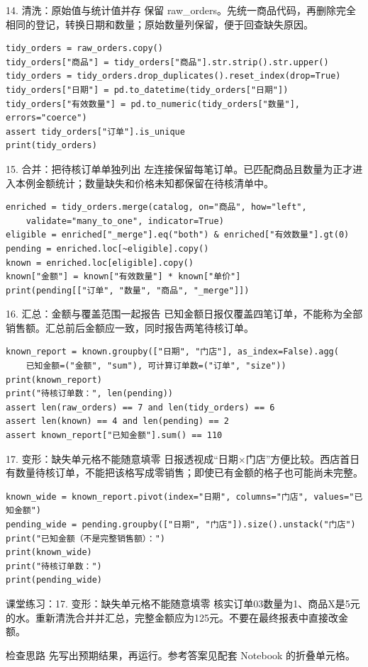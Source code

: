 \begin{frame}[fragile]{14. 清洗：原始值与统计值并存}
\small 保留 raw\_orders。先统一商品代码，再删除完全相同的登记，转换日期和数量；原始数量列保留，便于回查缺失原因。
\medskip
\begin{lstlisting}
tidy_orders = raw_orders.copy()
tidy_orders["商品"] = tidy_orders["商品"].str.strip().str.upper()
tidy_orders = tidy_orders.drop_duplicates().reset_index(drop=True)
tidy_orders["日期"] = pd.to_datetime(tidy_orders["日期"])
tidy_orders["有效数量"] = pd.to_numeric(tidy_orders["数量"], errors="coerce")
assert tidy_orders["订单"].is_unique
print(tidy_orders)
\end{lstlisting}
\end{frame}

\begin{frame}[fragile]{15. 合并：把待核订单单独列出}
\small 左连接保留每笔订单。已匹配商品且数量为正才进入本例金额统计；数量缺失和价格未知都保留在待核清单中。
\medskip
\begin{lstlisting}
enriched = tidy_orders.merge(catalog, on="商品", how="left",
    validate="many_to_one", indicator=True)
eligible = enriched["_merge"].eq("both") & enriched["有效数量"].gt(0)
pending = enriched.loc[~eligible].copy()
known = enriched.loc[eligible].copy()
known["金额"] = known["有效数量"] * known["单价"]
print(pending[["订单", "数量", "商品", "_merge"]])
\end{lstlisting}
\end{frame}

\begin{frame}[fragile]{16. 汇总：金额与覆盖范围一起报告}
\small 已知金额日报仅覆盖四笔订单，不能称为全部销售额。汇总前后金额应一致，同时报告两笔待核订单。
\medskip
\begin{lstlisting}
known_report = known.groupby(["日期", "门店"], as_index=False).agg(
    已知金额=("金额", "sum"), 可计算订单数=("订单", "size"))
print(known_report)
print("待核订单数：", len(pending))
assert len(raw_orders) == 7 and len(tidy_orders) == 6
assert len(known) == 4 and len(pending) == 2
assert known_report["已知金额"].sum() == 110
\end{lstlisting}
\end{frame}

\begin{frame}[fragile]{17. 变形：缺失单元格不能随意填零}
\small 日报透视成“日期×门店”方便比较。西店首日有数量待核订单，不能把该格写成零销售；即使已有金额的格子也可能尚未完整。
\medskip
\begin{lstlisting}
known_wide = known_report.pivot(index="日期", columns="门店", values="已知金额")
pending_wide = pending.groupby(["日期", "门店"]).size().unstack("门店")
print("已知金额（不是完整销售额）：")
print(known_wide)
print("待核订单数：")
print(pending_wide)
\end{lstlisting}
\end{frame}
\begin{frame}[fragile]{课堂练习：17. 变形：缺失单元格不能随意填零}
核实订单03数量为1、商品X是5元的水。重新清洗合并并汇总，完整金额应为125元。不要在最终报表中直接改金额。
\medskip
\begin{block}{检查思路}
先写出预期结果，再运行。参考答案见配套 Notebook 的折叠单元格。
\end{block}
\end{frame}
